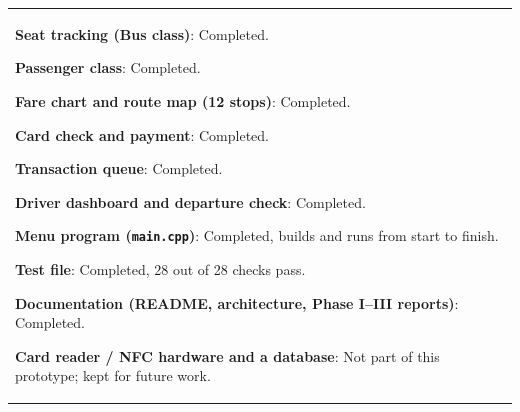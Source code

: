 \documentclass[12pt,a4paper]{article}
\newcommand{\answerbox}[2]{%
    \begin{tabularx}{\textwidth}{
        |>{\raggedright\arraybackslash}X|}
        \hline
        \parbox[t][#1][t]{\dimexpr\linewidth-12pt\relax}{
            \vspace{5pt}
            \fontsize{11}{13}\selectfont #2
        }\\
        \hline
    \end{tabularx}
}
\begin{document}
\vspace{0.25cm}

\answerbox{5.3cm}{\textbf{Seat tracking (Bus class)}: Completed.

\textbf{Passenger class}: Completed.

\textbf{Fare chart and route map (12 stops)}: Completed.

\textbf{Card check and payment}: Completed.

\textbf{Transaction queue}: Completed.

\textbf{Driver dashboard and departure check}: Completed.

\textbf{Menu program (\texttt{main.cpp})}: Completed, builds and runs from start to finish.

\textbf{Test file}: Completed, 28 out of 28 checks pass.

\textbf{Documentation (README, architecture, Phase I--III reports)}: Completed.

\textbf{Card reader / NFC hardware and a database}: Not part of this prototype; kept for future work.}
\end{document}
